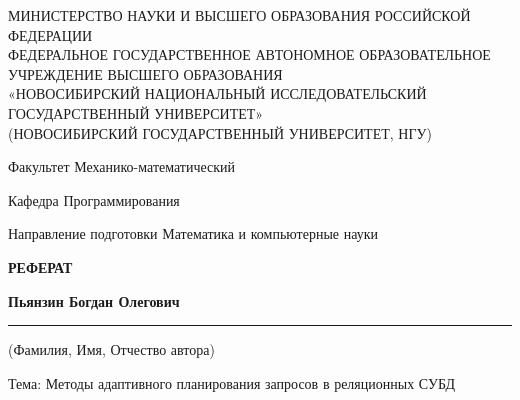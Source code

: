 \thispagestyle{empty}

\begin{center}
  МИНИСТЕРСТВО НАУКИ И ВЫСШЕГО ОБРАЗОВАНИЯ РОССИЙСКОЙ ФЕДЕРАЦИИ \\
  ФЕДЕРАЛЬНОЕ ГОСУДАРСТВЕННОЕ АВТОНОМНОЕ ОБРАЗОВАТЕЛЬНОЕ УЧРЕЖДЕНИЕ ВЫСШЕГО ОБРАЗОВАНИЯ \\
  «НОВОСИБИРСКИЙ НАЦИОНАЛЬНЫЙ ИССЛЕДОВАТЕЛЬСКИЙ ГОСУДАРСТВЕННЫЙ УНИВЕРСИТЕТ» \\
  (НОВОСИБИРСКИЙ ГОСУДАРСТВЕННЫЙ УНИВЕРСИТЕТ, НГУ)
\end{center}

\vspace{1.5cm}

\noindent %
Факультет \hfill Механико-математический \par

\vspace{1cm}

\noindent
Кафедра \hfill Программирования \par
\noindent
Направление подготовки \hfill Математика и компьютерные науки

\vspace{2cm}

\begin{center}
  \vspace{1em} %
  {\Large \textbf{РЕФЕРАТ}} %
  \vspace{1em} %
\end{center}


\begin{center}
  \textbf{Пьянзин Богдан Олегович}
  \rule[0.5ex]{\linewidth}{0.4pt}
  \small (Фамилия, Имя, Отчество автора)
\end{center}

\vspace{1.5cm}

\noindent Тема: Методы адаптивного планирования запросов в реляционных СУБД

\vspace{1.5cm}

